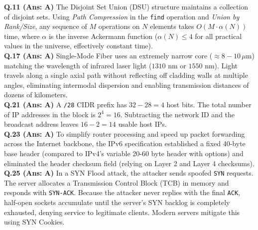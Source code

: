 \begin{solutionbox}
\textbf{Q.11 (Ans: A)} The Disjoint Set Union (DSU) structure maintains a collection of disjoint sets. Using \textit{Path Compression} in the \texttt{find} operation and \textit{Union by Rank/Size}, any sequence of $M$ operations on $N$ elements takes $O(M \cdot \alpha(N))$ time, where $\alpha$ is the inverse Ackermann function ($\alpha(N) \le 4$ for all practical values in the universe, effectively constant time).\\[2mm]
\textbf{Q.17 (Ans: A)} Single-Mode Fiber uses an extremely narrow core ($\approx 8 - 10\,\mu\text{m}$) matching the wavelength of infrared laser light ($1310\text{ nm}$ or $1550\text{ nm}$). Light travels along a single axial path without reflecting off cladding walls at multiple angles, eliminating intermodal dispersion and enabling transmission distances of dozens of kilometers.\\[2mm]
\textbf{Q.21 (Ans: A)} A \texttt{/28} CIDR prefix has $32 - 28 = 4$ host bits. The total number of IP addresses in the block is $2^4 = 16$. Subtracting the network ID and the broadcast address leaves $16 - 2 = 14$ usable host IPs.\\[2mm]
\textbf{Q.23 (Ans: A)} To simplify router processing and speed up packet forwarding across the Internet backbone, the IPv6 specification established a fixed 40-byte base header (compared to IPv4's variable 20-60 byte header with options) and eliminated the header checksum field (relying on Layer 2 and Layer 4 checksums).\\[2mm]
\textbf{Q.25 (Ans: A)} In a SYN Flood attack, the attacker sends spoofed \texttt{SYN} requests. The server allocates a Transmission Control Block (TCB) in memory and responds with \texttt{SYN-ACK}. Because the attacker never replies with the final \texttt{ACK}, half-open sockets accumulate until the server's SYN backlog is completely exhausted, denying service to legitimate clients. Modern servers mitigate this using SYN Cookies.
\end{solutionbox}

\newpage
